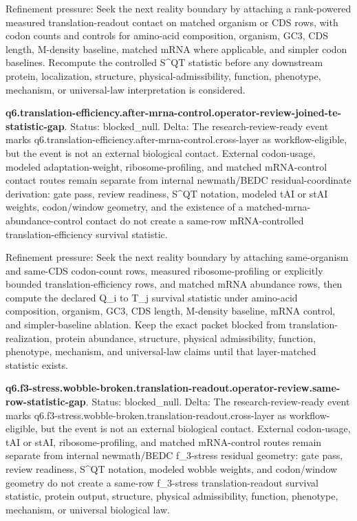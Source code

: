 Refinement pressure: Seek the next reality boundary by attaching a rank-powered measured translation-readout contact on matched organism or CDS rows, with codon counts and controls for amino-acid composition, organism, GC3, CDS length, M-density baseline, matched mRNA where applicable, and simpler codon baselines. Recompute the controlled S\textasciicircum{}QT statistic before any downstream protein, localization, structure, physical-admissibility, function, phenotype, mechanism, or universal-law interpretation is considered.

\textbf{q6.translation-efficiency.after-mrna-control.operator-review-joined-te-statistic-gap}. Status: blocked\_null. Delta: The research-review-ready event marks q6.translation-efficiency.after-mrna-control.cross-layer as workflow-eligible, but the event is not an external biological contact. External codon-usage, modeled adaptation-weight, ribosome-profiling, and matched mRNA-control contact routes remain separate from internal newmath/BEDC residual-coordinate derivation: gate pass, review readiness, S\textasciicircum{}QT notation, modeled tAI or stAI weights, codon/window geometry, and the existence of a matched-mrna-abundance-control contact do not create a same-row mRNA-controlled translation-efficiency survival statistic.

Refinement pressure: Seek the next reality boundary by attaching same-organism and same-CDS codon-count rows, measured ribosome-profiling or explicitly bounded translation-efficiency rows, and matched mRNA abundance rows, then compute the declared Q\_i to T\_j survival statistic under amino-acid composition, organism, GC3, CDS length, M-density baseline, mRNA control, and simpler-baseline ablation. Keep the exact packet blocked from translation-realization, protein abundance, structure, physical admissibility, function, phenotype, mechanism, and universal-law claims until that layer-matched statistic exists.

\textbf{q6.f3-stress.wobble-broken.translation-readout.operator-review.same-row-statistic-gap}. Status: blocked\_null. Delta: The research-review-ready event marks q6.f3-stress.wobble-broken.translation-readout.cross-layer as workflow-eligible, but the event is not an external biological contact. External codon-usage, tAI or stAI, ribosome-profiling, and matched mRNA-control routes remain separate from internal newmath/BEDC f\_3-stress residual geometry: gate pass, review readiness, S\textasciicircum{}QT notation, modeled wobble weights, and codon/window geometry do not create a same-row f\_3-stress translation-readout survival statistic, protein output, structure, physical admissibility, function, phenotype, mechanism, or universal biological law.

